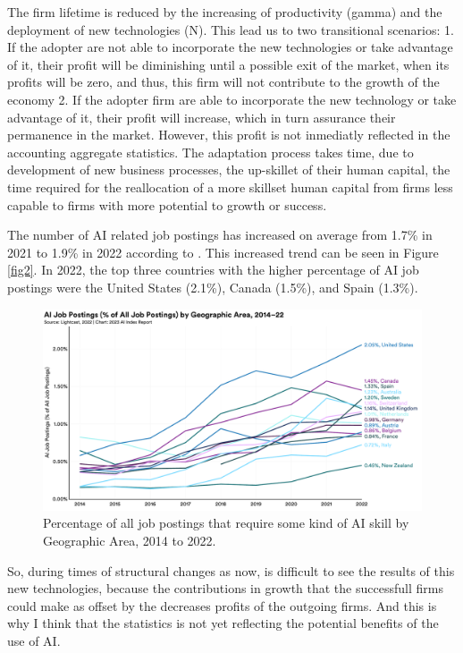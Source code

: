 \documentclass[preprint, 3p,
authoryear]{elsarticle} %
\begin{document}
The firm lifetime is reduced by the increasing of productivity (gamma)
and the deployment of new technologies (N). This lead us to two
transitional scenarios: 1. If the adopter are not able to incorporate
the new technologies or take advantage of it, their profit will be
diminishing until a possible exit of the market, when its profits will
be zero, and thus, this firm will not contribute to the growth of the
economy 2. If the adopter firm are able to incorporate the new
technology or take advantage of it, their profit will increase, which in
turn assurance their permanence in the market. However, this profit is
not inmediatly reflected in the accounting aggregate statistics. The
adaptation process takes time, due to development of new business
processes, the up-skillet of their human capital, the time required for
the reallocation of a more skillset human capital from firms less
capable to firms with more potential to growth or success.

The number of AI related job postings has increased on average from
1.7\% in 2021 to 1.9\% in 2022 according to \citep{reportAI}. This
increased trend can be seen in Figure \ref{fig2}. In 2022, the top three
countries with the higher percentage of AI job postings were the United
States (2.1\%), Canada (1.5\%), and Spain (1.3\%).

\begin{figure}

{\centering \includegraphics[width=0.7\linewidth]{../Views/AI_job_postings_by_geo_area} 

}

\caption{\label{fig2} Percentage of all job postings that require some kind of AI skill by Geographic Area, 2014 to 2022.}\label{fig:fig2}
\end{figure}

So, during times of structural changes as now, is difficult to see the
results of this new technologies, because the contributions in growth
that the successfull firms could make as offset by the decreases profits
of the outgoing firms. And this is why I think that the statistics is
not yet reflecting the potential benefits of the use of AI.
\end{document}
